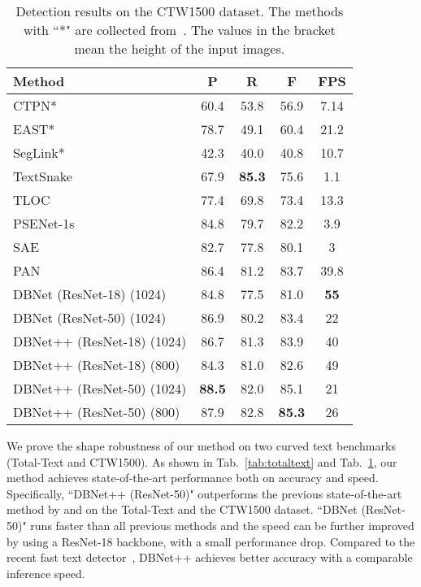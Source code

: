 \begin{table}[!ht]
\setlength{\tabcolsep}{9.5pt}
\centering
\caption{Detection results on the CTW1500 dataset. The methods with ``*" are collected from~\cite{ctw1500}. The values in the bracket mean the height of the input images.}
\begin{tabularx}{1.0\linewidth}{lc*{3}c}
\toprule
Method        & P             & R             & F             & FPS         \\ \midrule
CTPN*          & 60.4          & 53.8          & 56.9          & 7.14        \\ 
EAST*          & 78.7          & 49.1          & 60.4          & 21.2        \\ 
SegLink*       & 42.3            & 40.0            & 40.8            & 10.7         \\ 
TextSnake~\cite{long2018textsnake}     & 67.9          & \textbf{85.3}          & 75.6          & 1.1         \\ 
TLOC~\cite{ctw1500}     & 77.4            & 69.8          & 73.4          & 13.3           \\ 
PSENet-1s~\cite{wang2019shape}    & 84.8         & 79.7          & 82.2          & 3.9         \\ 
SAE~\cite{tian2019learning}       & 82.7          & 77.8          & 80.1    & 3  \\ 
PAN~\cite{wang2019efficient}  & 86.4          & 81.2          & 83.7    & 39.8  \\ 
\midrule  
DBNet (ResNet-18) (1024)~\cite{LiaoWYCB20} & 84.8          & 77.5          & 81.0          & \textbf{55} \\ 
DBNet (ResNet-50) (1024)~\cite{LiaoWYCB20} & 86.9 & 80.2 & 83.4 & 22          \\ 
\midrule
DBNet++ (ResNet-18) (1024)   & 86.7 & 81.3 & 83.9 & 40 \\ 
DBNet++ (ResNet-18) (800)   & 84.3 & 81.0 & 82.6 & 49  \\ 
DBNet++ (ResNet-50) (1024)   & \textbf{88.5} & 82.0 & 85.1 & 21  \\ 
DBNet++ (ResNet-50) (800)  & 87.9 & 82.8 & \textbf{85.3} & 26  \\ \bottomrule
\end{tabularx}
\label{tab:CTW}
\end{table}

We prove the shape robustness of our method on two curved text benchmarks (Total-Text and CTW1500). As shown in Tab.~\ref{tab:totaltext} and Tab.~\ref{tab:CTW}, our method achieves state-of-the-art performance both on accuracy and speed.
Specifically, ``DBNet++ (ResNet-50)" outperforms the previous state-of-the-art method by  and  on the Total-Text and the CTW1500 dataset.
``DBNet (ResNet-50)" runs faster than all previous methods and the speed can be further improved by using a ResNet-18 backbone, with a small performance drop. Compared to the recent fast text detector~\cite{wang2019efficient}, DBNet++ achieves better accuracy with a comparable inference speed.

